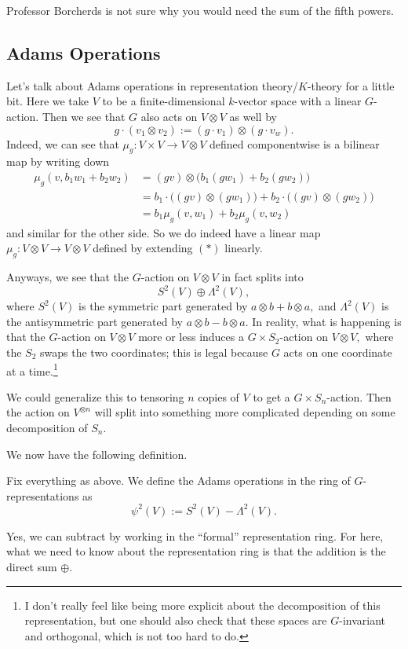 \documentclass[../notes.tex]{subfiles}
\begin{document}
\begin{remark}
	Professor Borcherds is not sure why you would need the sum of the fifth powers.
\end{remark}

\subsection{Adams Operations}
Let's talk about Adams operations in representation theory/$K$-theory for a little bit. Here we take $V$ to be a finite-dimensional $k$-vector space with a linear $G$-action. Then we see that $G$ also acts on $V\otimes V$ as well by
\[g\cdot(v_1\otimes v_2):=(g\cdot v_1)\otimes(g\cdot v_w).\tag{$*$}\]
Indeed, we can see that $\mu_g:V\times V\to V\otimes V$ defined componentwise is a bilinear map by writing down
\begin{align*}
	\mu_g(v,b_1w_1+b_2w_2) &= (gv)\otimes\big(b_1(gw_1)+b_2(gw_2)\big) \\
	&= b_1\cdot\big((gv)\otimes(gw_1)\big)+b_2\cdot\big((gv)\otimes(gw_2)\big) \\
	&= b_1\mu_g(v,w_1)+b_2\mu_g(v,w_2)
\end{align*}
and similar for the other side. So we do indeed have a linear map $\mu_g:V\otimes V\to V\otimes V$ defined by extending $(*)$ linearly. 

Anyways, we see that the $G$-action on $V\otimes V$ in fact splits into
\[S^2(V)\oplus\Lambda^2(V),\]
where $S^2(V)$ is the symmetric part generated by $a\otimes b+b\otimes a,$ and $\Lambda^2(V)$ is the antisymmetric part generated by $a\otimes b-b\otimes a.$ In reality, what is happening is that the $G$-action on $V\otimes V$ more or less induces a $G\times S_2$-action on $V\otimes V,$ where the $S_2$ swaps the two coordinates; this is legal because $G$ acts on one coordinate at a time.\footnote{I don't really feel like being more explicit about the decomposition of this representation, but one should also check that these spaces are $G$-invariant and orthogonal, which is not too hard to do.}
\begin{remark}
	We could generalize this to {tensor}ing $n$ copies of $V$ to get a $G\times S_n$-action. Then the action on $V^{\otimes n}$ will split into something more complicated depending on some decomposition of $S_n.$
\end{remark}
We now have the following definition.
\begin{definition}
	Fix everything as above. We define the Adams operations in the ring of $G$-representations as
	\[\psi^2(V):=S^2(V)-\Lambda^2(V).\]
\end{definition}
Yes, we can subtract by working in the ``formal'' representation ring. For here, what we need to know about the representation ring is that the addition is the direct sum $\oplus.$
\end{document}
